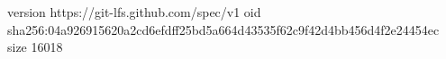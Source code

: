 version https://git-lfs.github.com/spec/v1
oid sha256:04a926915620a2cd6efdff25bd5a664d43535f62c9f42d4bb456d4f2e24454ec
size 16018

